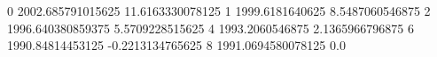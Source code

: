 0 2002.685791015625 11.6163330078125
1 1999.6181640625 8.5487060546875
2 1996.640380859375 5.5709228515625
4 1993.2060546875 2.1365966796875
6 1990.84814453125 -0.2213134765625
8 1991.0694580078125 0.0
